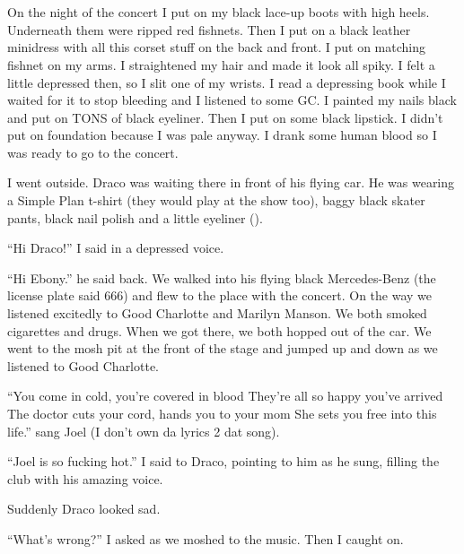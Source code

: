 \section{\chaptername~\thesection}


\XXX{\Xfill}

On the night of the concert I put on my black lace-up boots with high heels. Underneath them were ripped red fishnets. Then I put on a black leather minidress with all this corset stuff on the back and front. I put on matching fishnet on my arms. I straightened my hair and made it look all spiky. I felt a little depressed then, so I slit one of my wrists. I read a depressing book while I waited for it to stop bleeding and I listened to some GC. I painted my nails black and put on TONS of black eyeliner. Then I put on some black lipstick. I didn't put on foundation because I was pale anyway. I drank some human blood so I was ready to go to the concert.

I went outside. Draco was waiting there in front of his flying car. He was wearing a Simple Plan t-shirt (they would play at the show too), baggy black skater pants, black nail polish and a little eyeliner ().

\enquote{Hi Draco!} I said in a depressed voice.

\enquote{Hi Ebony.} he said back. We walked into his flying black Mercedes-Benz (the license plate said 666) and flew to the place with the concert. On the way we listened excitedly to Good Charlotte and Marilyn Manson. We both smoked cigarettes and drugs. When we got there, we both hopped out of the car. We went to the mosh pit at the front of the stage and jumped up and down as we listened to Good Charlotte.

\enquote{You come in cold, you're covered in blood
They're all so happy you've arrived
The doctor cuts your cord, hands you to your mom
She sets you free into this life.} sang Joel (I don't own da lyrics 2 dat song).

\enquote{Joel is so fucking hot.} I said to Draco, pointing to him as he sung, filling the club with his amazing voice.

Suddenly Draco looked sad.

\enquote{What's wrong?} I asked as we moshed to the music. Then I caught on.

